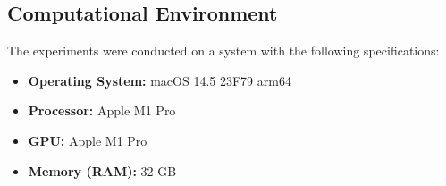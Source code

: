 \documentclass[12pt]{article}
\begin{document}
\subsection{Computational Environment} \label{subsection:environment}
The experiments were conducted on a system with the following specifications:
\begin{itemize}
    \item \textbf{Operating System:} macOS 14.5 23F79 arm64
    \item \textbf{Processor:} Apple M1 Pro
    \item \textbf{GPU:} Apple M1 Pro
    \item \textbf{Memory (RAM):} 32 GB
\end{itemize}



\end{document}
